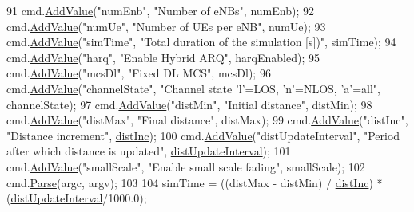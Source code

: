 \begin{DoxyCode}
91         cmd.\hyperlink{classns3_1_1CommandLine_addcfb546c7ad4c8bd0965654d55beb8e}{AddValue}(\textcolor{stringliteral}{"numEnb"}, \textcolor{stringliteral}{"Number of eNBs"}, numEnb);
92         cmd.\hyperlink{classns3_1_1CommandLine_addcfb546c7ad4c8bd0965654d55beb8e}{AddValue}(\textcolor{stringliteral}{"numUe"}, \textcolor{stringliteral}{"Number of UEs per eNB"}, numUe);
93         cmd.\hyperlink{classns3_1_1CommandLine_addcfb546c7ad4c8bd0965654d55beb8e}{AddValue}(\textcolor{stringliteral}{"simTime"}, \textcolor{stringliteral}{"Total duration of the simulation [s])"}, simTime);
94         cmd.\hyperlink{classns3_1_1CommandLine_addcfb546c7ad4c8bd0965654d55beb8e}{AddValue}(\textcolor{stringliteral}{"harq"}, \textcolor{stringliteral}{"Enable Hybrid ARQ"}, harqEnabled);
95         cmd.\hyperlink{classns3_1_1CommandLine_addcfb546c7ad4c8bd0965654d55beb8e}{AddValue}(\textcolor{stringliteral}{"mcsDl"}, \textcolor{stringliteral}{"Fixed DL MCS"}, mcsDl);
96         cmd.\hyperlink{classns3_1_1CommandLine_addcfb546c7ad4c8bd0965654d55beb8e}{AddValue}(\textcolor{stringliteral}{"channelState"}, \textcolor{stringliteral}{"Channel state 'l'=LOS, 'n'=NLOS, 'a'=all"}, channelState);
97         cmd.\hyperlink{classns3_1_1CommandLine_addcfb546c7ad4c8bd0965654d55beb8e}{AddValue}(\textcolor{stringliteral}{"distMin"}, \textcolor{stringliteral}{"Initial distance"}, distMin);
98         cmd.\hyperlink{classns3_1_1CommandLine_addcfb546c7ad4c8bd0965654d55beb8e}{AddValue}(\textcolor{stringliteral}{"distMax"}, \textcolor{stringliteral}{"Final distance"}, distMax);
99         cmd.\hyperlink{classns3_1_1CommandLine_addcfb546c7ad4c8bd0965654d55beb8e}{AddValue}(\textcolor{stringliteral}{"distInc"}, \textcolor{stringliteral}{"Distance increment"}, \hyperlink{mmwave-tdma_8cc_ab6f0966775123c3c56e8b826c0a659d5}{distInc});
100         cmd.\hyperlink{classns3_1_1CommandLine_addcfb546c7ad4c8bd0965654d55beb8e}{AddValue}(\textcolor{stringliteral}{"distUpdateInterval"}, \textcolor{stringliteral}{"Period after which distance is updated"}, 
      \hyperlink{mmwave-tdma_8cc_a5366a103b1af38305a434287c90c58b9}{distUpdateInterval});
101         cmd.\hyperlink{classns3_1_1CommandLine_addcfb546c7ad4c8bd0965654d55beb8e}{AddValue}(\textcolor{stringliteral}{"smallScale"}, \textcolor{stringliteral}{"Enable small scale fading"}, smallScale);
102         cmd.\hyperlink{classns3_1_1CommandLine_a5c10b85b3207e5ecb48d907966923156}{Parse}(argc, argv);
103 
104         simTime = ((distMax - distMin) / \hyperlink{mmwave-tdma_8cc_ab6f0966775123c3c56e8b826c0a659d5}{distInc}) * (\hyperlink{mmwave-tdma_8cc_a5366a103b1af38305a434287c90c58b9}{distUpdateInterval}/1000.0);

\end{DoxyCode}
